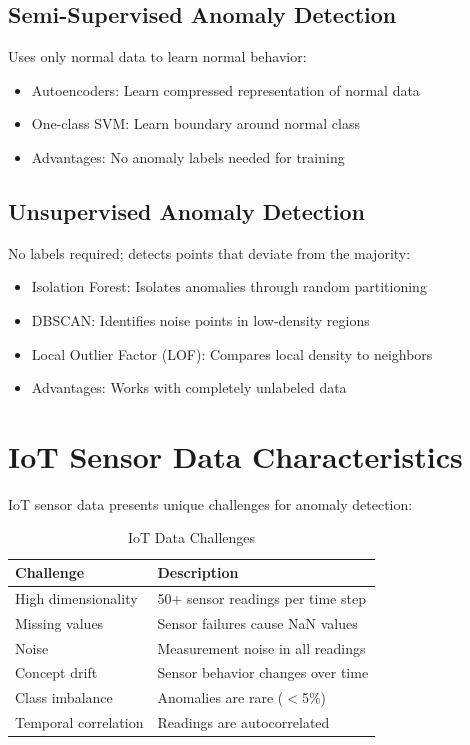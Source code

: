\documentclass[12pt,a4paper]{report}
\begin{document}
\subsection{Semi-Supervised Anomaly Detection}
Uses only normal data to learn normal behavior:
\begin{itemize}
    \item Autoencoders: Learn compressed representation of normal data
    \item One-class SVM: Learn boundary around normal class
    \item Advantages: No anomaly labels needed for training
\end{itemize}

\subsection{Unsupervised Anomaly Detection}
No labels required; detects points that deviate from the majority:
\begin{itemize}
    \item Isolation Forest: Isolates anomalies through random partitioning
    \item DBSCAN: Identifies noise points in low-density regions
    \item Local Outlier Factor (LOF): Compares local density to neighbors
    \item Advantages: Works with completely unlabeled data
\end{itemize}

\section{IoT Sensor Data Characteristics}
\label{sec:iot_characteristics}
IoT sensor data presents unique challenges for anomaly detection:

\begin{table}[H]
\centering
\caption{IoT Data Challenges}
\begin{tabular}{ll}
\toprule
\textbf{Challenge} & \textbf{Description} \\
\midrule
High dimensionality & 50+ sensor readings per time step \\
Missing values & Sensor failures cause NaN values \\
Noise & Measurement noise in all readings \\
Concept drift & Sensor behavior changes over time \\
Class imbalance & Anomalies are rare ($<$5\%) \\
Temporal correlation & Readings are autocorrelated \\
\bottomrule
\end{tabular}
\end{table}
\end{document}
